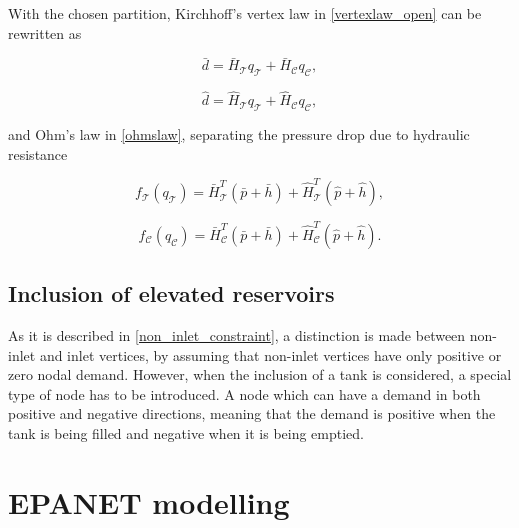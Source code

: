 With the chosen partition, Kirchhoff's vertex law in \eqref{vertexlaw_open} can be rewritten as

\begin{equation}
  \label{vertexlaw_partitioned1}
  \bar{d} = \bar{H}_{\mathcal{T}} q_{\mathcal{T}} + \bar{H}_{\mathcal{C}} q_{\mathcal{C}},
\end{equation}

\begin{equation}
  \label{vertexlaw_partitioned2}
  \hat{d} = \hat{H}_{\mathcal{T}} q_{\mathcal{T}} + \hat{H}_{\mathcal{C}} q_{\mathcal{C}},
\end{equation}

and Ohm's law in \eqref{ohmslaw}, separating the pressure drop due to hydraulic resistance

\begin{equation}
  \label{ohmslaw_partitioned1}
  f_{\mathcal{T}}(q_\mathcal{T}) = \bar{H}^T_{\mathcal{T}} (\bar{p} + \bar{h}) + \hat{H}^T_{\mathcal{T}} (\hat{p} + \hat{h}),
\end{equation}

\begin{equation}
  \label{ohmslaw_partitioned2}
  f_{\mathcal{C}}(q_\mathcal{C}) = \bar{H}^T_{\mathcal{C}} (\bar{p} + \bar{h}) + \hat{H}^T_{\mathcal{C}} (\hat{p} + \hat{h}).
\end{equation}



\subsection{Inclusion of elevated reservoirs}
\label{inclusion_of_reservoirs}

As it is described in \eqref{non_inlet_constraint}, a distinction is made between non-inlet and inlet vertices, by assuming that non-inlet vertices have only positive or zero nodal demand. However, when the inclusion of a tank is considered, a special type of node has to be introduced. A node which can have a demand in both positive and negative directions, meaning that the demand is positive when the tank is being filled and negative when it is being emptied.



\section{EPANET modelling}
\label{EPANET_modelling}

